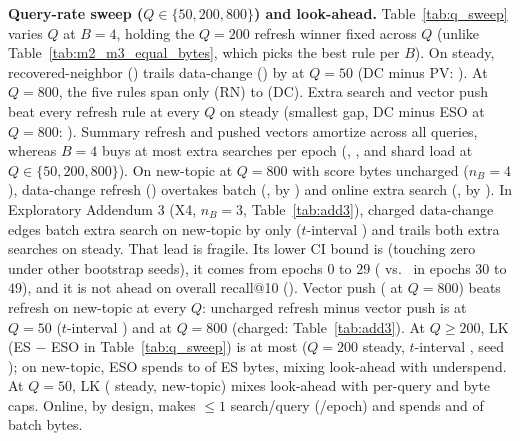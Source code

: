 \textbf{Query-rate sweep ($Q \in \{50, 200, 800\}$) and look-ahead.} Table~\ref{tab:q_sweep} varies $Q$ at $B = 4$, holding the $Q = 200$ refresh winner fixed across $Q$ (unlike Table~\ref{tab:m2_m3_equal_bytes}, which picks the best rule per $B$). On steady, recovered-neighbor (\RNumMOneRNRecentMeanQFiftySteady{}) trails data-change (\RNumMOneDCRecentMeanQFiftySteady{}) by \RNumMOneDCMinusRNQFiftySteady{} at $Q{=}50$ (DC minus PV: \RNumMOneDCMinusPVQFiftySteady{}). At $Q{=}800$, the five rules span only \RNumMOneRNRecentMeanQEightHundredSteady{} (RN) to \RNumMOneDCRecentMeanQEightHundredSteady{} (DC). Extra search and vector push beat every refresh rule at every $Q$ on steady (smallest gap, DC minus ESO at $Q{=}800$: \RNumMOneDCMinusESOQEightHundredSteady{}). Summary refresh and pushed vectors amortize across all queries, whereas $B = 4$ buys at most \RNumExtraSearchesBFour{} extra searches per epoch (\RNumESLoadPctQFifty{}, \RNumESLoadPctQTwoHundred{}, and \RNumESLoadPctQEightHundred{} shard load at $Q \in \{50, 200, 800\}$). On new-topic at $Q = 800$ with score bytes uncharged ($n_B = 4$), data-change refresh (\RNumQSweepRefRecentQEightHundredNewTopic{}) overtakes batch (\RNumQSweepESRecentQEightHundredNewTopic{}, by \RNumQSweepRefMinusESQEightHundredNewTopic{}) and online extra search (\RNumQSweepESORecentQEightHundredNewTopic{}, by \RNumQSweepRefMinusESOQEightHundredNewTopic{}). In Exploratory Addendum 3 (X4, $n_B{=}3$, Table~\ref{tab:add3}), charged data-change edges batch extra search on new-topic by only \RNumAddThreeXFourESNewTopic{} ($t$-interval \RNumAddThreeXFourESNewTopicTInt{}) and trails both extra searches on steady. That lead is fragile. Its lower CI bound is \RNumAddThreeXFourESNewTopicBootLow{} (touching zero under other bootstrap seeds), it comes from epochs $0$ to $29$ (\RNumAddThreeXFourESNewTopicEarlyMean{} vs.\ \RNumAddThreeXFourESNewTopicLateMean{} in epochs $30$ to $49$), and it is not ahead on overall recall@10 (\RNumAddThreeXFourESOverallNewTopic{}). Vector push (\RNumQSweepPVRecentQEightHundredNewTopic{} at $Q{=}800$) beats refresh on new-topic at every $Q$: uncharged refresh minus vector push is \RNumQSweepRefMinusPVQFiftyNewTopic{} at $Q{=}50$ ($t$-interval \RNumQSweepRefMinusPVQFiftyNewTopicTInt{}) and \RNumQSweepRefMinusPVQEightHundredNewTopic{} at $Q{=}800$ (charged: Table~\ref{tab:add3}). At $Q \ge 200$, LK (ES $-$ ESO in Table~\ref{tab:q_sweep}) is at most \RNumLookaheadMOneQTwoHundredSteady{} ($Q{=}200$ steady, $t$-interval \RNumLookaheadMOneQTwoHundredSteadyTInt{}, seed \RNumLookaheadMOneQTwoHundredSteadyNegSeed{} \RNumLookaheadMOneQTwoHundredSteadyNegSeedGap{}); on new-topic, ESO spends \RNumMOneESOShareOfESQTwoHundredNewTopic{} to \RNumMOneESOShareOfESQEightHundredNewTopic{} of ES bytes, mixing look-ahead with underspend. At $Q{=}50$, LK (\RNumLookaheadMOneQFiftySteady{} steady, \RNumLookaheadMOneQFiftyNewTopic{} new-topic) mixes look-ahead with per-query and byte caps. Online, by design, makes $\le 1$ search/query (\RNumESOQFiftyMaxSearches{}/epoch) and spends \RNumMOneESOShareOfESQFiftySteady{} and \RNumMOneESOShareOfESQFiftyNewTopic{} of batch bytes.

